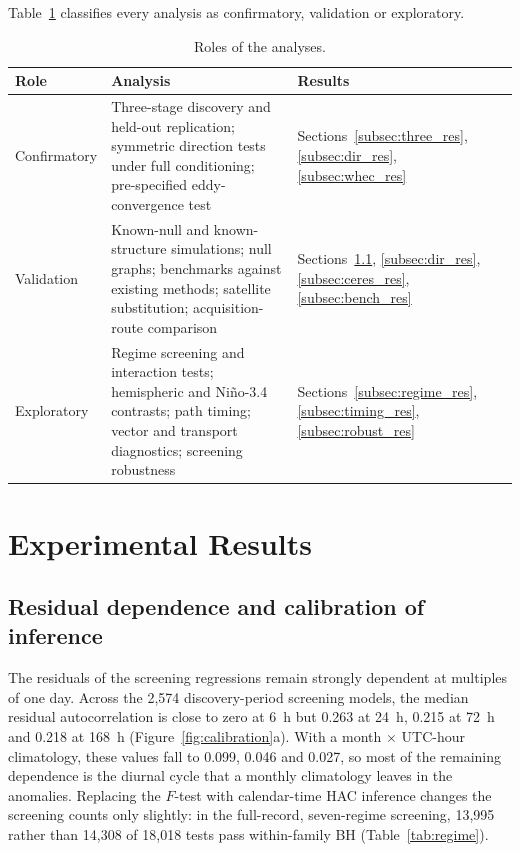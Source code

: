 \documentclass[preprint,12pt]{elsarticle}
\begin{document}
Table~\ref{tab:roles} classifies every analysis as confirmatory, validation or exploratory.

\begin{table}[htbp]
\centering
\caption{Roles of the analyses.}
\label{tab:roles}
\footnotesize
\begin{tabular}{@{}p{}p{}p{}@{}}
\toprule
Role & Analysis & Results \\
\midrule
Confirmatory & Three-stage discovery and held-out replication; symmetric direction tests under full conditioning; pre-specified eddy-convergence test & Sections~\ref{subsec:three_res}, \ref{subsec:dir_res}, \ref{subsec:whec_res} \\
Validation & Known-null and known-structure simulations; null graphs; benchmarks against existing methods; satellite substitution; acquisition-route comparison & Sections~\ref{subsec:calib}, \ref{subsec:dir_res}, \ref{subsec:ceres_res}, \ref{subsec:bench_res} \\
Exploratory & Regime screening and interaction tests; hemispheric and Ni\~no-3.4 contrasts; path timing; vector and transport diagnostics; screening robustness & Sections~\ref{subsec:regime_res}, \ref{subsec:timing_res}, \ref{subsec:robust_res} \\
\bottomrule
\end{tabular}
\end{table}

\section{Experimental Results}
\label{sec:results}

\subsection{Residual dependence and calibration of inference}
\label{subsec:calib}

The residuals of the screening regressions remain strongly dependent at multiples of one day. Across the 2,574 discovery-period screening models, the median residual autocorrelation is close to zero at 6~h but 0.263 at 24~h, 0.215 at 72~h and 0.218 at 168~h (Figure~\ref{fig:calibration}a). With a month $\times$ UTC-hour climatology, these values fall to 0.099, 0.046 and 0.027, so most of the remaining dependence is the diurnal cycle that a monthly climatology leaves in the anomalies. Replacing the $F$-test with calendar-time HAC inference changes the screening counts only slightly: in the full-record, seven-regime screening, 13,995 rather than 14,308 of 18,018 tests pass within-family BH (Table~\ref{tab:regime}).
\end{document}
